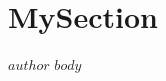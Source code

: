 \documentclass[letterpaper,openany,oneside]{book}
\begin{document}
\frontmatter

\tableofcontents
\mainmatter
\section*{MySection}
$author$
$body$
\nocite{*}
\printbibliography
\appendix
\end{document}
